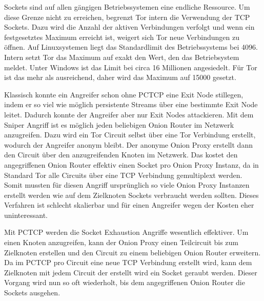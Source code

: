 \documentclass[fleqn,envcountsame,runningheads,10pt,a4paper]{llncs}
\begin{document}
Sockets sind auf allen gängigen Betriebssystemen eine endliche Ressource. Um 
diese Grenze nicht zu erreichen, begrenzt Tor intern die Verwendung der TCP 
Sockets. Dazu wird die Anzahl der aktiven Verbindungen verfolgt und wenn ein 
festgesetztes Maximum erreicht ist, weigert sich Tor neue Verbindungen zu 
öffnen. Auf Linuxsystemen liegt das Standardlimit des Betriebssystems bei 4096. 
Intern setzt Tor das Maximum auf exakt den Wert, den das Betriebsystem meldet. 
Unter Windows ist das Limit bei circa 16 Millionen angesiedelt. Für Tor ist das 
mehr als ausreichend, daher wird das Maximum auf 15000 gesetzt\cite{imux}.

Klassisch konnte ein Angreifer schon ohne PCTCP eine Exit Node stillegen, indem 
er so viel wie möglich persistente Streams über eine bestimmte Exit Node 
leitet. Dadurch konnte der Angreifer aber nur Exit Nodes attackieren. Mit dem 
Sniper Angriff \cite{sniper} ist es möglich jeden beliebigen Onion Router im 
Netzwerk anzugreifen. Dazu wird ein Tor Circuit selbst über eine Tor Verbindung 
erstellt, wodurch der Angreifer anonym bleibt. Der anonyme Onion Proxy erstellt 
dann den Circuit über den anzugreifenden Knoten im Netzwerk. Das kostet den 
angegriffenen Onion Router effektiv einen Socket pro Onion Proxy Instanz, da in 
Standard Tor alle Circuits über eine TCP Verbindung gemultiplext werden. Somit 
mussten für diesen Angriff ursprünglich so viele Onion Proxy Instanzen erstellt 
werden wie auf dem Zielknoten Sockets verbraucht werden sollten. Dieses 
Verfahren ist schlecht skalierbar und für einen Angreifer wegen der Kosten eher 
uninteressant.

Mit PCTCP werden die Socket Exhaustion Angriffe wesentlich effektiver. Um einen 
Knoten anzugreifen, kann der Onion Proxy einen Teilcircuit bis zum Zielknoten 
erstellen und den Circuit zu einem beliebigen Onion Router erweitern. Da im 
PCTCP pro Circuit eine neue TCP Verbindung erstellt wird, kann dem Zielknoten mit 
jedem Circuit der erstellt wird ein Socket geraubt werden. Dieser Vorgang wird 
nun so oft wiederholt, bis dem angegriffenen Onion Router die Sockets ausgehen.
\end{document}
